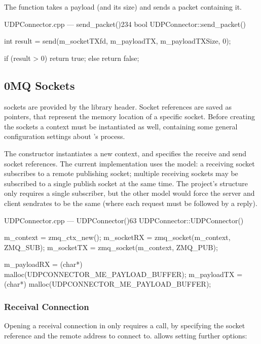 The  function takes a \gls{payload} (and its size) and sends a \gls{packet} containing it.

\begin{codelist}{UDPConnector.cpp --- send\_packet()}{234}
bool UDPConnector::send_packet() {
	int result = send(m_socketTXfd, m_payloadTX, m_payloadTXSize, 0);

	if (result > 0)
		return true;
	else
		return false;
}
\end{codelist}

\subsection{0MQ Sockets}

 sockets are provided by the  library  header. Socket references are saved as  pointers, that represent the memory location of a specific socket. Before creating the sockets a context must be instantiated as well, containing some general configuration settings about 's process.

The  constructor instantiates a new context, and specifies the receive and send socket references. The current implementation uses the  model: a receiving socket subscribes to a remote publishing socket; multiple receiving sockets may be subscribed to a single publish socket at the same time. The project's structure only requires a single subscriber, but the other  model would force the server and client sendrates to be the same (where each request must be followed by a reply).

\begin{codelist}{UDPConnector.cpp --- UDPConnector()}{63}
UDPConnector::UDPConnector() {
	m_context  = zmq_ctx_new();
	m_socketRX = zmq_socket(m_context, ZMQ_SUB);
	m_socketTX = zmq_socket(m_context, ZMQ_PUB);

	m_payloadRX = (char*) malloc(UDPCONNECTOR_ME_PAYLOAD_BUFFER);
	m_payloadTX = (char*) malloc(UDPCONNECTOR_ME_PAYLOAD_BUFFER);
}
\end{codelist}

\subsubsection{Receival Connection}

Opening a receival connection in  only requires a  call, by specifying the socket reference and the remote address to connect to.  allows setting further options:

